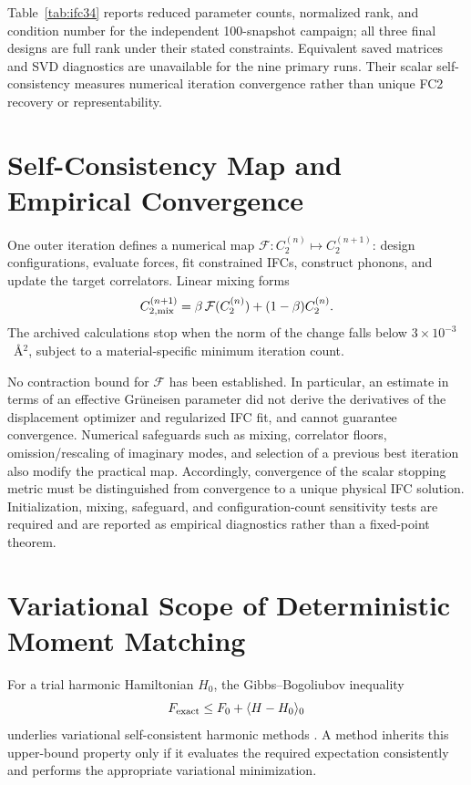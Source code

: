 \documentclass[aps,prb,reprint,amsmath,amssymb,floatfix]{revtex4-2}
\begin{document}
\color{revisionblue}
Table~\ref{tab:ifc34} reports reduced parameter counts, normalized rank, and
condition number for the independent 100-snapshot campaign; all three final
designs are full rank under their stated constraints. Equivalent saved matrices
and SVD diagnostics are unavailable for the nine primary runs. Their scalar
self-consistency measures numerical iteration convergence rather than unique
FC2 recovery or representability.
\color{black}

\color{revisionblue}
\section{Self-Consistency Map and Empirical Convergence}
\label{appendix-f-self-consistency-fixed-point-analysis-and-convergence}
\color{black}

\color{revisionblue}
One outer iteration defines a numerical map
\(\mathcal F:C_2^{(n)}\mapsto C_2^{(n+1)}\): design configurations,
evaluate forces, fit constrained IFCs, construct phonons, and update the target
correlators. Linear mixing forms
\[
C_{2,\rm mix}^{(n+1)}
=\beta\,\mathcal F(C_2^{(n)})+(1-\beta)C_2^{(n)} .
\]
The archived calculations stop when the norm of the change falls below
\(3\times10^{-3}\)~Å\(^2\), subject to a material-specific minimum iteration
count.
\color{black}

\color{revisionblue}
No contraction bound for \(\mathcal F\) has been established. In particular,
an estimate in terms of an effective Gr\"uneisen parameter did not
derive the derivatives of the displacement optimizer and regularized IFC fit,
and cannot guarantee convergence. Numerical safeguards such as mixing,
correlator floors, omission/rescaling of imaginary modes, and selection of a
previous best iteration also modify the practical map. Accordingly,
convergence of the scalar stopping metric must be distinguished from
convergence to a unique physical IFC solution. Initialization, mixing,
safeguard, and configuration-count sensitivity tests are required and are
reported as empirical diagnostics rather than a fixed-point theorem.
\color{black}

\color{revisionblue}
\section{Variational Scope of Deterministic Moment Matching}
\label{appendix-g-variational-scope-of-deterministic-moment-matching}
\color{black}

\color{revisionblue}
For a trial harmonic Hamiltonian \(H_0\), the Gibbs--Bogoliubov inequality
\[
F_{\rm exact}\leq F_0+\langle H-H_0\rangle_0
\]
underlies variational self-consistent harmonic methods
\cite{ref7,ref8,ref50}. A method inherits this upper-bound property only if it
evaluates the required expectation consistently and performs the appropriate
variational minimization.
\color{black}
\end{document}
